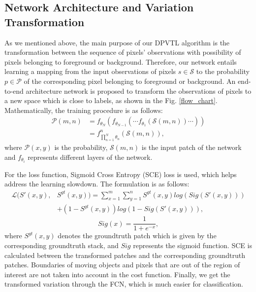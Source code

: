 \documentclass[journal]{IEEEtran}
\newcommand{\reffig}[1]{Fig. \ref{#1}}
\begin{document}
\subsection*{Network Architecture and Variation Transformation}
As we mentioned above,
the main purpose of our DPVTL algorithm is the transformation between the sequence of pixels' observations with possibility of pixels belonging to foreground or background.
Therefore,
our network entails learning a mapping from the input observations of pixels $s \in \mathcal{S}$ 
to the probability $p \in \mathcal{P}$ of the corresponding pixel belonging to foreground or background.
%
An end-to-end architecture network is proposed to transform the observations of pixels to a new space which is close to labels, as shown in the \reffig{flow_chart}.
%
Mathematically, the training procedure is as follows:
\begin{equation}
    \begin{split}
        \mathcal{P}(m,n) & = f_{\theta_N} ( f_{\theta_{N - 1}} ( \cdots f_{\theta_1} ( \mathcal{S}(m,n)) \cdots  ) )  \\
          & = f_{ \prod_{n=1}^{N}\theta_n   }^n(\mathcal{S}(m,n)),
    \end{split}
\end{equation}
where $\mathcal{P}(x,y)$ is the probability, $\mathcal{S}(m,n)$ is the input patch of the network and $f_{\theta_i}$ represents different layers of the network.

For the loss function, Sigmoid Cross Entropy (SCE) loss is used, which helps address the learning slowdown. 
The formulation is as follows:
\begin{equation}
    \begin{split}
         \mathcal{L}(S'(x,y),& S^{gt}(x,y))  =  \sum_{x=1}^{m}\sum_{y=1}^{n} S^{gt}(x,y) log(Sig(S'(x,y)))  \\
        & + (1 - S^{gt}(x,y)) log(1 - Sig(S'(x,y))), 
    \end{split}
\end{equation}
\begin{equation}
       Sig(x) =\frac{1}{1+e^{-x}},
\end{equation}
where $S^{gt}(x,y)$ denotes the groundtruth patch which is given by the corresponding groundtruth stack, and $Sig$ represents the sigmoid function. 
SCE is calculated between the transformed patches and the corresponding groundtruth patches. 
Boundaries of moving objects and pixels that are out of the region of interest are not taken into account in the cost function.
Finally, we get the transformed variation through the FCN, which is much easier for classification. 
\end{document}
